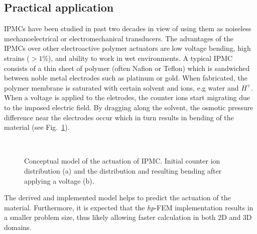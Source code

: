 \subsection{Practical application}
IPMCs have been studied in past two decades in view of using them
as noiseless mechanoelectrical or electromechanical transducers.
The advantages of the IPMCs over other electroactive polymer actuators
are low voltage bending, high strains ($>1\%$), and ability to work
in wet environments. A typical IPMC consists of a thin sheet of polymer
(often Nafion or Teflon) which is sandwiched between noble
metal electrodes such as platinum or gold. When fabricated, the polymer 
membrane is saturated with certain solvent and ions, e.g water and $H^+$.
When a voltage is applied to the eletrodes, the counter ions start
migrating due to the imposed electric field. By dragging along the solvent,
the osmotic pressure difference near the electrodes occur which in turn
results in bending of the material (see Fig.~\ref{fig:conceptual}).
\begin{figure}
  \begin{centering}
    ~
  \par\end{centering}
  \caption{\label{fig:conceptual}Conceptual model of the actuation
 	of IPMC. Initial counter ion distribution (a) and
	the distribution and resulting bending after applying a voltage (b).}
\end{figure}
The derived and implemented model helps to predict the actuation of the
material. Furthermore, it is expected that the \emph{hp}-FEM implementation
results in a smaller problem size, thus likely allowing faster calculation
in both 2D and 3D domains.

